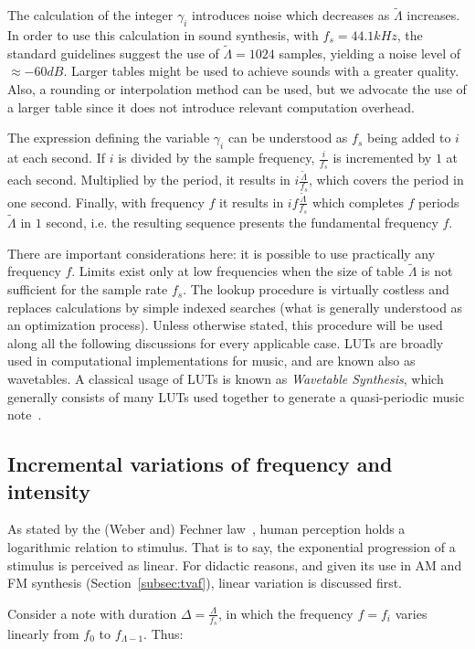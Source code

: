 The calculation of the integer $\gamma_i$ introduces noise which decreases as $\widetilde{\Lambda}$ increases.
In order to use this calculation in sound synthesis,
with $f_s=44.1 kHz$, the standard guidelines suggest the use of $\widetilde{\Lambda} = 1024$ samples,
yielding a noise level of $\approx -60dB$.
Larger tables might be used to achieve sounds with a greater quality.
Also, a rounding or interpolation method can be used,
but we advocate the use of a larger table since it does not
introduce relevant computation overhead.~\cite{Geiger}

The expression defining the variable $\gamma_i$ can be understood as $f_s$ being added to $i$ at each second.
If $i$ is divided by the sample frequency, $\frac{i}{f_s}$
is incremented by $1$ at each second. Multiplied by the period, it results in $i \frac{\widetilde{\Lambda}}{f_s}$, which covers the period in one second.
Finally, with frequency $f$ it results in $i f \frac{\widetilde{\Lambda}}{f_s}$ which completes $f$ periods $\widetilde{\Lambda}$ in $1$ second, i.e. the resulting sequence presents the fundamental frequency $f$.

There are important considerations here: it is possible to use practically any frequency $f$.
Limits exist only at low frequencies when the size of table $\widetilde{\Lambda}$ is not sufficient for the sample rate $f_s$.
The lookup procedure is virtually costless and replaces calculations by simple indexed searches 
(what is generally understood as an optimization process).
Unless otherwise stated, this procedure will be used along all the following discussions for every applicable case.
LUTs are broadly used in computational implementations for music,
and are known also as wavetables.
A classical usage of LUTs is known as \emph{Wavetable Synthesis},
which generally consists of many LUTs used together to generate a quasi-periodic music note~\cite{Cook,Wavetable}.

\subsection{Incremental variations of frequency and intensity}\label{subsec:vars}
As stated by the (Weber and) Fechner law~\cite{Weber-Fechner},
human perception holds a logarithmic relation to stimulus.
That is to say, the exponential progression of a stimulus is perceived as linear.
For didactic reasons, and given its use in AM and FM synthesis (Section~\ref{subsec:tvaf}), linear variation is discussed first.

Consider a note with duration $\Delta = \frac{\Lambda}{f_s}$, in which the frequency $f=f_i$ varies linearly from $f_0$ to $f_{\Lambda -1}$. Thus:

